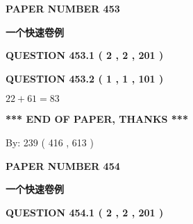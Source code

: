 \documentclass{ctexart}
\begin{document}
   
 {\textbf{ \Large{ PAPER NUMBER  453  }}}
   
   
\vspace{0.2in}
   
   
   
   
   
   
 \vspace{0.2in}
{\LARGE {\textbf{ 一个快速卷例}}}
   
   
  
\vspace{0.2in}
  
{\textbf{\Large{QUESTION
453.1 
 ( 2 , 2 , 201 )
}}}
  
  
  
\vspace{0.2in}
  
{\textbf{\Large{QUESTION
453.2 
 ( 1 , 1 , 101 )
}}}
  
  
 
 

$ %
22 +  %
61=   %
83$
 
 
   
   
 \vspace{0.2in}
 
   
   
   
   
\vspace{1.0in} 
{\textbf{\large{ *** END OF PAPER, THANKS *** }}} 
   
   
\hspace{1.0in} By: 
 239 ( 416 ,  613 )
   
   
   
   
\newpage 
\setcounter{page}{ 
   454001 } 
   
   
   
   
 {\textbf{ \Large{ PAPER NUMBER  454  }}}
   
   
\vspace{0.2in}
   
   
   
   
   
   
 \vspace{0.2in}
{\LARGE {\textbf{ 一个快速卷例}}}
   
   
  
\vspace{0.2in}
  
{\textbf{\Large{QUESTION
454.1 
 ( 2 , 2 , 201 )
}}}
  
\end{document}
